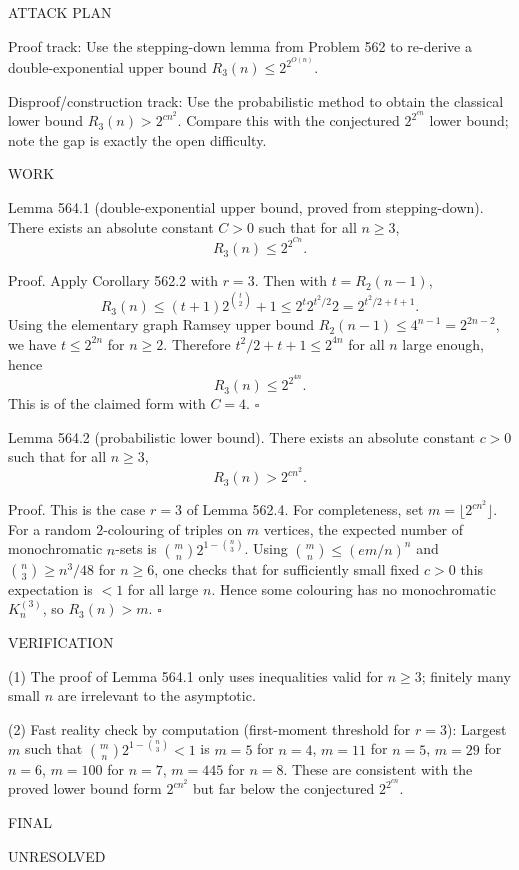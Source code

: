 ATTACK PLAN

Proof track:
Use the stepping-down lemma from Problem 562 to re-derive a double-exponential upper bound $R_3(n)\le 2^{2^{O(n)}}$.

Disproof/construction track:
Use the probabilistic method to obtain the classical lower bound $R_3(n) > 2^{c n^2}$.
Compare this with the conjectured $2^{2^{c n}}$ lower bound; note the gap is exactly the open difficulty.

WORK

Lemma 564.1 (double-exponential upper bound, proved from stepping-down).
There exists an absolute constant $C>0$ such that for all $n\ge 3$,
\[
R_3(n) \le 2^{2^{C n}}.
\]

Proof.
Apply Corollary 562.2 with $r=3$. Then with $t=R_2(n-1)$,
\[
R_3(n) \le (t+1) 2^{\binom{t}{2}} + 1 \le 2^{t} 2^{t^2/2} 2 = 2^{t^2/2+t+1}.
\]
Using the elementary graph Ramsey upper bound $R_2(n-1)\le 4^{n-1}=2^{2n-2}$,
we have $t\le 2^{2n}$ for $n\ge 2$.
Therefore $t^2/2+t+1 \le 2^{4n}$ for all $n$ large enough, hence
\[
R_3(n) \le 2^{2^{4n}}.
\]
This is of the claimed form with $C=4$. \hfill$\square$

Lemma 564.2 (probabilistic lower bound).
There exists an absolute constant $c>0$ such that for all $n\ge 3$,
\[
R_3(n) > 2^{c n^2}.
\]

Proof.
This is the case $r=3$ of Lemma 562.4. For completeness, set $m=\lfloor 2^{c n^2}\rfloor$.
For a random $2$-colouring of triples on $m$ vertices, the expected number of monochromatic $n$-sets is
$\binom{m}{n}2^{1-\binom{n}{3}}$.
Using $\binom{m}{n}\le (em/n)^n$ and $\binom{n}{3}\ge n^3/48$ for $n\ge 6$, one checks that for sufficiently small fixed $c>0$ this expectation is $<1$ for all large $n$.
Hence some colouring has no monochromatic $K_n^{(3)}$, so $R_3(n)>m$. \hfill$\square$

VERIFICATION

(1) The proof of Lemma 564.1 only uses inequalities valid for $n\ge 3$; finitely many small $n$ are irrelevant to the asymptotic.

(2) Fast reality check by computation (first-moment threshold for $r=3$):
Largest $m$ such that $\binom{m}{n}2^{1-\binom{n}{3}}<1$ is
$m=5$ for $n=4$, $m=11$ for $n=5$, $m=29$ for $n=6$, $m=100$ for $n=7$, $m=445$ for $n=8$.
These are consistent with the proved lower bound form $2^{c n^2}$ but far below the conjectured $2^{2^{c n}}$.

FINAL

UNRESOLVED

